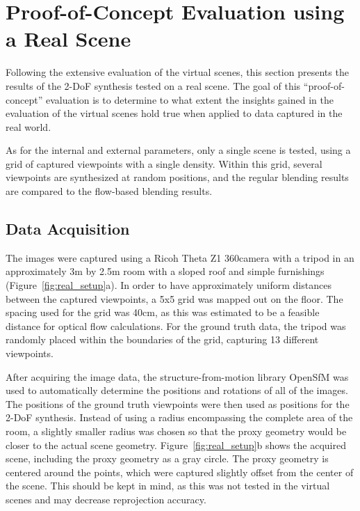 \section{Proof-of-Concept Evaluation using a Real Scene} \label{sec:pof_eval}
Following the extensive evaluation of the virtual scenes, this section presents the results of the 2-DoF synthesis tested on a real scene. The goal of this ``proof-of-concept'' evaluation is to determine to what extent the insights gained in the evaluation of the virtual scenes hold true when applied to data captured in the real world.

As for the internal and external parameters, only a single scene is tested, using a grid of captured viewpoints with a single density. Within this grid, several viewpoints are synthesized at random positions, and the regular blending results are compared to the flow-based blending results.

\subsection{Data Acquisition}
The images were captured using a Ricoh Theta Z1 360\degree camera with a tripod in an approximately 3m by 2.5m room with a sloped roof and simple furnishings (Figure~\ref{fig:real_setup}a). In order to have approximately uniform distances between the captured viewpoints, a 5x5 grid was mapped out on the floor. The spacing used for the grid was 40cm, as this was estimated to be a feasible distance for optical flow calculations. For the ground truth data, the tripod was randomly placed within the boundaries of the grid, capturing 13 different viewpoints.

After acquiring the image data, the structure-from-motion library OpenSfM \cite{opensfm} was used to automatically determine the positions and rotations of all of the images. The positions of the ground truth viewpoints were then used as positions for the 2-DoF synthesis.
Instead of using a radius encompassing the complete area of the room, a slightly smaller radius was chosen so that the proxy geometry would be closer to the actual scene geometry. Figure~\ref{fig:real_setup}b shows the acquired scene, including the proxy geometry as a gray circle. The proxy geometry is centered around the points, which were captured slightly offset from the center of the scene. This should be kept in mind, as this was not tested in the virtual scenes and may decrease reprojection accuracy.

